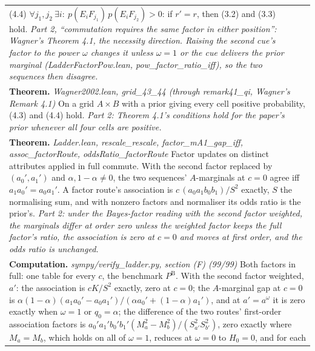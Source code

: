 \documentclass[10pt]{article}
\theoremstyle{definition}
\newcommand{\PB}{P^{\mathrm{B}}}
\newlength{\fullw}\setlength{\fullw}{25.9cm}
\begin{document}
{\begin{longtable}{|p{0.9cm}|p{12.2cm}|p{12.2cm}|}
{(4.4) $\forall j_1,j_2\ \exists i:\ p(E_iF_{j_1})\,p(E_iF_{j_2})>0$: if $r'=r$, then (3.2) and (3.3)
hold. \newline \textit{Part 2, ``commutation requires the same factor in either position'': Wagner's Theorem 4.1, the necessity direction. Raising the second cue's factor to the power $\omega$ changes it unless $\omega=1$ or the cue delivers the prior marginal (LadderFactorPow.lean, pow\_factor\_ratio\_iff), so the two sequences then disagree.}} \\
\multicolumn{3}{|p{\fullw}|}{\textbf{Theorem.} \textit{Wagner2002.lean, grid\_43\_44 (through remark41\_qi, Wagner's Remark 4.1)} \newline On a grid $A\times B$ with a prior giving every cell positive probability, (4.3) and
(4.4) hold. \newline \textit{Part 2: Theorem 4.1's conditions hold for the paper's prior whenever all four cells are positive.}} \\
\multicolumn{3}{|p{\fullw}|}{\textbf{Theorem.} \textit{Ladder.lean, rescale\_rescale, factor\_mA1\_gap\_iff, assoc\_factorRoute, oddsRatio\_factorRoute} \newline Factor updates on distinct attributes applied in full commute. With the second factor
replaced by $(a_0',a_1')$ and $\alpha,1-\alpha\neq0$, the two sequences' $A$-marginals at $c=0$
agree iff $a_1a_0'=a_0a_1'$. A factor route's association is
$c\,(a_0a_1b_0b_1)/S^2$ exactly, $S$ the normalising sum, and with nonzero factors and
normaliser its odds ratio is the prior's. \newline \textit{Part 2: under the Bayes-factor reading with the second factor weighted, the marginals differ at order zero unless the weighted factor keeps the full factor's ratio, the association is zero at $c=0$ and moves at first order, and the odds ratio is unchanged.}} \\
\multicolumn{3}{|p{\fullw}|}{\textbf{Computation.} \textit{sympy/verify\_ladder.py, section (F) (99/99)} \newline Both factors in full: one table for every $c$, the benchmark $\PB$. With the second
factor weighted, $a'$: the association is $cK/S^2$ exactly, zero at $c=0$; the $A$-marginal gap
at $c=0$ is $\alpha(1-\alpha)(a_1a_0'-a_0a_1')/(\alpha a_0'+(1-\alpha)a_1')$, and at $a'=a^{\omega}$ it is
zero exactly when $\omega=1$ or $q_0=\alpha$; the difference of the two routes' first-order
association factors is $a_0'a_1'b_0'b_1'(M_a^2-M_b^2)/(S_{a'}^2S_{b'}^2)$, zero exactly where
$M_a=M_b$, which holds on all of $\omega=1$, reduces at $\omega=0$ to $H_0=0$, and for each
}
\end{longtable}}
\end{document}
